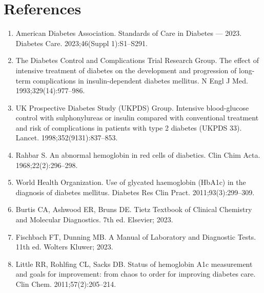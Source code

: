 \section*{References}
\begin{enumerate}
  \item American Diabetes Association. Standards of Care in Diabetes --- 2023. Diabetes Care. 2023;46(Suppl 1):S1--S291.
  \item The Diabetes Control and Complications Trial Research Group. The effect of intensive treatment of diabetes on the development and progression of long-term complications in insulin-dependent diabetes mellitus. N Engl J Med. 1993;329(14):977--986.
  \item UK Prospective Diabetes Study (UKPDS) Group. Intensive blood-glucose control with sulphonylureas or insulin compared with conventional treatment and risk of complications in patients with type 2 diabetes (UKPDS 33). Lancet. 1998;352(9131):837--853.
  \item Rahbar S. An abnormal hemoglobin in red cells of diabetics. Clin Chim Acta. 1968;22(2):296--298.
  \item World Health Organization. Use of glycated haemoglobin (HbA1c) in the diagnosis of diabetes mellitus. Diabetes Res Clin Pract. 2011;93(3):299--309.
  \item Burtis CA, Ashwood ER, Bruns DE. Tietz Textbook of Clinical Chemistry and Molecular Diagnostics. 7th ed. Elsevier; 2023.
  \item Fischbach FT, Dunning MB. A Manual of Laboratory and Diagnostic Tests. 11th ed. Wolters Kluwer; 2023.
  \item Little RR, Rohlfing CL, Sacks DB. Status of hemoglobin A1c measurement and goals for improvement: from chaos to order for improving diabetes care. Clin Chem. 2011;57(2):205--214.
\end{enumerate}

\clearpage
